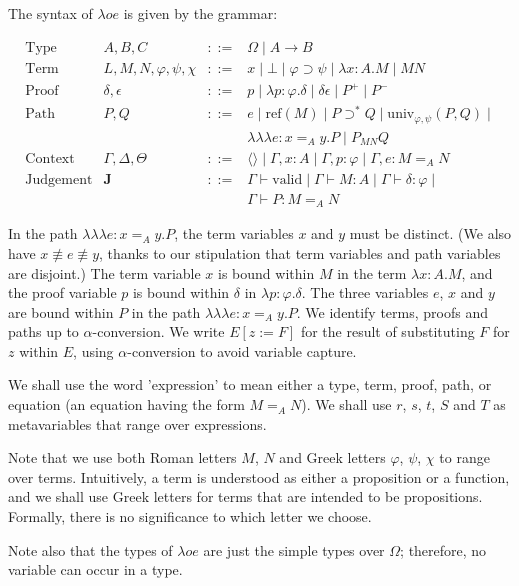 \documentclass[a4paper,UKenglish]{lipics-v2016}
\newcommand*{\reff}[1]{\ensuremath{\mathrm{ref} \left( {#1} \right)}}
\newcommand*{\univ}[4]{\ensuremath{\mathrm{univ}_{{#1}, {#2}} \left({#3} , {#4} \right)}}
\newcommand*{\triplelambda}{\ensuremath{\lambda \!\! \lambda \!\! \lambda}}
\newcommand*{\vald}{\ensuremath{\vdash \mathrm{valid}}}
\theoremstyle{plain}
\theoremstyle{definition}
\begin{document}
The syntax of $\lambda o e$ is given by the grammar:

\[
\begin{array}{lrcl}
\text{Type} & A,B,C & ::= & \Omega \mid A \rightarrow B \\
\text{Term} & L,M,N, \varphi,\psi,\chi & ::= & x \mid \bot \mid \varphi \supset \psi \mid \lambda x:A.M \mid MN \\
\text{Proof} & \delta, \epsilon & ::= & p \mid \lambda p:\varphi.\delta \mid \delta \epsilon \mid P^+ \mid P^- \\
\text{Path} & P, Q & ::= & e \mid \reff{M} \mid P \supset^* Q \mid \univ{\varphi}{\psi}{P}{Q} \mid \\
& & & \triplelambda e : x =_A y. P \mid P_{MN} Q \\
\text{Context} & \Gamma, \Delta, \Theta & ::= & \langle \rangle \mid \Gamma, x : A \mid \Gamma, p : \varphi \mid \Gamma, e : M =_A N \\
\text{Judgement} & \mathbf{J} & ::= & \Gamma \vald \mid \Gamma \vdash M : A \mid \Gamma \vdash \delta : \varphi \mid \\
& & & \Gamma \vdash P : M =_A N
\end{array}
\]

In the path $\triplelambda e : x =_A y . P$, the term variables $x$ and $y$ must be distinct.  (We also have $x \not\equiv e \not\equiv y$, thanks to our
stipulation that term variables and path variables are disjoint.)  The term variable $x$ is bound within $M$ in the term $\lambda x:A.M$,
and the proof variable $p$ is bound within $\delta$ in $\lambda p:\varphi.\delta$.  The three variables $e$, $x$ and $y$ are bound within $P$ in the path
$\triplelambda e:x =_A y.P$.  We identify terms, proofs and paths up to $\alpha$-conversion.  We write $E[z:=F]$ for the result of substituting $F$ for $z$ within
$E$, using $\alpha$-conversion to avoid variable capture.

We shall use the word 'expression' to mean either a type, term, proof, path, or equation (an equation having the form $M =_A N$).  We shall use $r$, $s$, $t$, $S$ and $T$ as metavariables that range over expressions.

Note that we use both Roman letters $M$, $N$ and Greek letters $\varphi$, $\psi$, $\chi$ to range over terms.  Intuitively, a term is understood as either a proposition or a function,
and we shall use Greek letters for terms that are intended to be propositions.  Formally, there is no significance to which letter we choose.

Note also that the types of $\lambda o e$ are just the simple types over $\Omega$; therefore, no variable can occur in a type.
\end{document}
